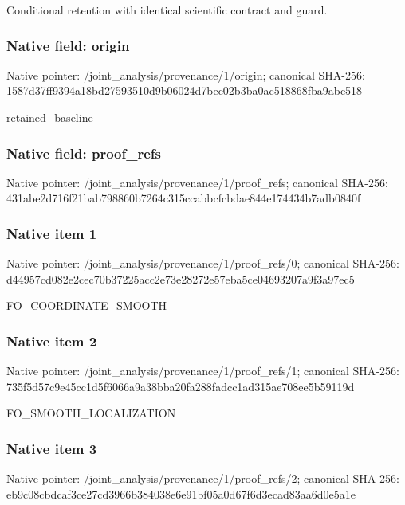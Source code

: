 \documentclass[10pt,a4paper]{article}
\begin{document}
\begingroup\raggedright\sloppy Conditional retention with identical scientific contract and guard.\par\endgroup

\subsubsection{Native field: origin}
Native pointer: /joint\_\allowbreak{}analysis/provenance/1/origin; canonical SHA-256: 1587d37ff9394a18bd27593510d9b06024d7bec02b3ba0ac518868fba9abc518

\begingroup\raggedright\sloppy retained\_\allowbreak{}baseline\par\endgroup

\subsubsection{Native field: proof\_\allowbreak{}refs}
Native pointer: /joint\_\allowbreak{}analysis/provenance/1/proof\_\allowbreak{}refs; canonical SHA-256: 431abe2d716f21bab798860b7264c315ccabbcfcbdae844e174434b7adb0840f

\subsubsection{Native item 1}
Native pointer: /joint\_\allowbreak{}analysis/provenance/1/proof\_\allowbreak{}refs/0; canonical SHA-256: d44957cd082e2cec70b37225acc2e73e28272e57eba5ce04693207a9f3a97ec5

\begingroup\raggedright\sloppy FO\_\allowbreak{}COORDINATE\_\allowbreak{}SMOOTH\par\endgroup

\subsubsection{Native item 2}
Native pointer: /joint\_\allowbreak{}analysis/provenance/1/proof\_\allowbreak{}refs/1; canonical SHA-256: 735f5d57c9e45cc1d5f6066a9a38bba20fa288fadcc1ad315ae708ee5b59119d

\begingroup\raggedright\sloppy FO\_\allowbreak{}SMOOTH\_\allowbreak{}LOCALIZATION\par\endgroup

\subsubsection{Native item 3}
Native pointer: /joint\_\allowbreak{}analysis/provenance/1/proof\_\allowbreak{}refs/2; canonical SHA-256: eb9c08cbdcaf3ce27cd3966b384038e6e91bf05a0d67f6d3ecad83aa6d0e5a1e
\end{document}
